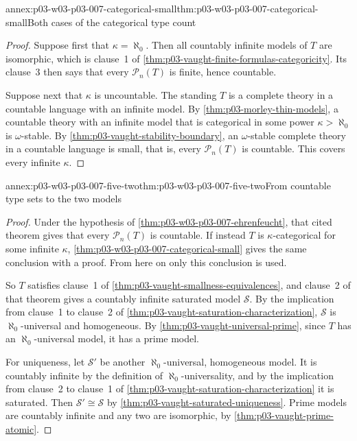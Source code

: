 \begin{annexitem}{annex:p03-w03-p03-007-categorical-small}{thm:p03-w03-p03-007-categorical-small}{Both cases of the categorical type count}
\begin{proof}
Suppose first that \(\kappa=\aleph_0\). Then all countably infinite models
of \(T\) are isomorphic, which is clause~1 of
\cref{thm:p03-vaught-finite-formulas-categoricity}. Its clause~3 then says
that every \(\mathcal P_n(T)\) is finite, hence countable.

Suppose next that \(\kappa\) is uncountable. The standing \(T\) is a
complete theory in a countable language with an infinite model. By
\cref{thm:p03-morley-thin-models}, a countable theory with an infinite model
that is categorical in some power \(\kappa>\aleph_0\) is \(\omega\)-stable.
By \cref{thm:p03-vaught-stability-boundary}, an \(\omega\)-stable complete
theory in a countable language is small, that is, every \(\mathcal P_n(T)\)
is countable. This covers every infinite \(\kappa\).
\end{proof}
\end{annexitem}

\begin{annexitem}{annex:p03-w03-p03-007-five-two}{thm:p03-w03-p03-007-five-two}{From countable type sets to the two models}
\begin{proof}
Under the hypothesis of \cref{thm:p03-w03-p03-007-ehrenfeucht}, that cited
theorem gives that every \(\mathcal P_n(T)\) is countable. If instead \(T\) is
\(\kappa\)-categorical for some infinite \(\kappa\),
\cref{thm:p03-w03-p03-007-categorical-small} gives the same conclusion with
a proof. From here on only this conclusion is used.

So \(T\) satisfies clause~1 of
\cref{thm:p03-vaught-smallness-equivalences}, and clause~2 of that theorem
gives a countably infinite saturated model \(\mathcal S\). By the implication
from clause~1 to clause~2 of
\cref{thm:p03-vaught-saturation-characterization}, \(\mathcal S\) is
\(\aleph_0\)-universal and homogeneous. By
\cref{thm:p03-vaught-universal-prime}, since \(T\) has an
\(\aleph_0\)-universal model, it has a prime model.

For uniqueness, let \(\mathcal S'\) be another \(\aleph_0\)-universal,
homogeneous model. It is countably infinite by the definition of
\(\aleph_0\)-universality, and by the implication from clause~2 to clause~1
of \cref{thm:p03-vaught-saturation-characterization} it is saturated. Then
\(\mathcal S'\cong\mathcal S\) by \cref{thm:p03-vaught-saturated-uniqueness}.
Prime models are countably infinite and any two are isomorphic, by
\cref{thm:p03-vaught-prime-atomic}.
\end{proof}
\end{annexitem}

